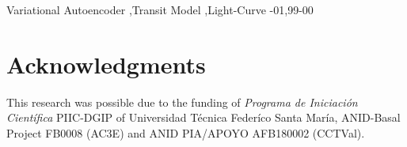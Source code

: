 \documentclass[review]{elsarticle}
\begin{document}
\begin{frontmatter}
\begin{keyword}
Variational Autoencoder \sep  Transit Model \sep Light-Curve
-01\sep  99-00
\end{keyword}

\end{frontmatter}


\linenumbers














\section*{Acknowledgments}
This research was possible due to the funding of \textit{Programa de Iniciaci\'on Cient\'ifica} PIIC-DGIP of Universidad T\'ecnica Feder\'ico Santa Mar\'ia, ANID-Basal Project FB0008 (AC3E) and ANID PIA/APOYO AFB180002 (CCTVal).


\end{document}
